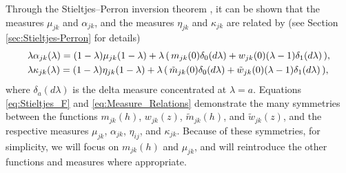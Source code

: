 \documentclass{cmslatex}
\begin{document}
Through the Stieltjes--Perron inversion theorem 
\cite{Henrici:1974:v2,MILTON:2002:TC}, it can be shown
\cite{Murphy:JMP:063506} that the measures $\mu_{jk}$ and $\alpha_{jk}$, and
the measures $\eta_{jk}$ and $\kappa_{jk}$ are related by (see Section
\ref{sec:Stieltjes-Perron} for details)   
%
\begin{align}\label{eq:Measure_Relations}
  &\lambda\alpha_{jk}(\lambda)=(1-\lambda)\mu_{jk}(1-\lambda) +
       \lambda\,(\,m_{jk}(0)\delta_0(d\lambda)+w_{jk}(0)(\lambda-1)\delta_1(d\lambda)\,),
  \\
  &\lambda\kappa_{jk}(\lambda)=(1-\lambda)\eta_{jk}(1-\lambda) +
       \lambda\,(\,\tilde{m}_{jk}(0)\delta_0(d\lambda)+\tilde{w}_{jk}(0)(\lambda-1)\delta_1(d\lambda)\,),
  \notag     
\end{align}
%
where $\delta_a(d\lambda)$ is the delta measure concentrated at $\lambda=a$. Equations
\eqref{eq:Stieltjes_F} and \eqref{eq:Measure_Relations} demonstrate
the many symmetries between the functions $m_{jk}(h)$, $w_{jk}(z)$,
$\tilde{m}_{jk}(h)$, and $\tilde{w}_{jk}(z)$, and the respective 
measures $\mu_{jk}$, $\alpha_{jk}$, $\eta_{ij}$, and $\kappa_{jk}$. Because of these
symmetries, for simplicity, we will focus on $m_{jk}(h)$ and $\mu_{jk}$,
and will reintroduce the other functions and measures where
appropriate.  
\end{document}
